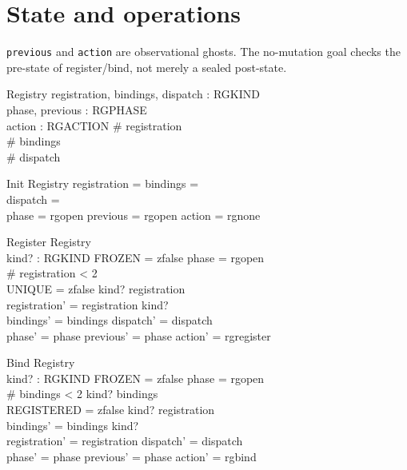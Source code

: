 \documentclass[a4paper,10pt,fleqn]{article}
\begin{document}
\section{State and operations}
\texttt{previous} and \texttt{action} are observational ghosts. The no-mutation
goal checks the pre-state of register/bind, not merely a sealed post-state.
\begin{schema}{Registry}
  registration, bindings, dispatch : \seq RGKIND \\
  phase, previous : RGPHASE \\
  action : RGACTION
\where
  \# registration  \\
  \# bindings  \\
  \# dispatch 
\end{schema}
\begin{schema}{Init}
  Registry
\where
  registration = \langle \rangle \land bindings = \langle \rangle \\
  dispatch = \langle \rangle \\
  phase = rgopen \land previous = rgopen \land action = rgnone
\end{schema}
\begin{schema}{Register}
  \Delta Registry \\
  kind? : RGKIND
\where
  FROZEN = zfalse \lor phase = rgopen \\
  \# registration < 2 \\
  UNIQUE = zfalse \lor kind? \notin \ran registration \\
  registration' = registration \cat \langle kind? \rangle \\
  bindings' = bindings \land dispatch' = dispatch \\
  phase' = phase \land previous' = phase \land action' = rgregister
\end{schema}
\begin{schema}{Bind}
  \Delta Registry \\
  kind? : RGKIND
\where
  FROZEN = zfalse \lor phase = rgopen \\
  \# bindings < 2 \land kind? \notin \ran bindings \\
  REGISTERED = zfalse \lor kind? \in \ran registration \\
  bindings' = bindings \cat \langle kind? \rangle \\
  registration' = registration \land dispatch' = dispatch \\
  phase' = phase \land previous' = phase \land action' = rgbind
\end{schema}
\end{document}
